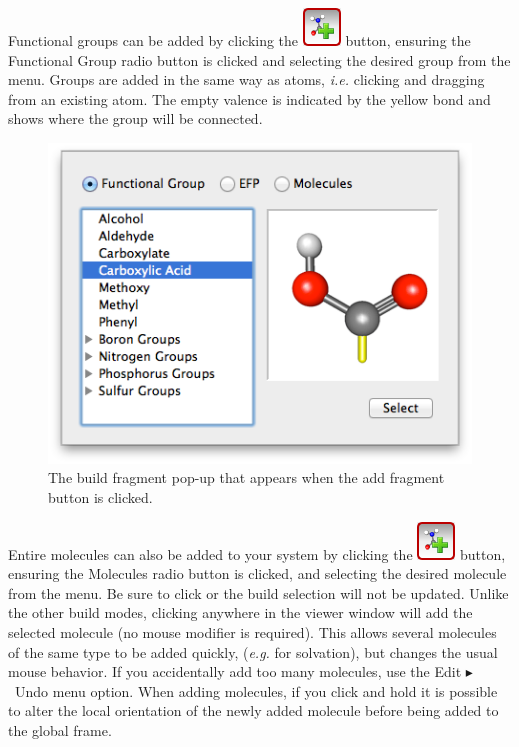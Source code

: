 \documentclass[a4paper,12pt]{article}
\newcommand{\bt}{\ensuremath{\blacktriangleright}}
\begin{document}
Functional groups can be added by clicking the
\includegraphics[scale=0.40]{figures/BuildFragButton.png} button, ensuring the
Functional Group radio button is clicked and selecting the desired group from
the menu.  Groups are added in the same way as atoms, \emph{i.e.} clicking and
dragging from an existing atom.  The empty valence is indicated by the yellow
bond and shows where the group will be connected.
\begin{figure}
\begin{center}
\includegraphics[scale=0.5]{figures/FunctionalGroup.png}
\caption{The build fragment pop-up that appears when the add fragment button
is clicked.} 
\end{center}
\end{figure}


Entire molecules can also be added to your system by clicking the
\includegraphics[scale=0.40]{figures/BuildFragButton.png} button, ensuring the
Molecules radio button is clicked, and selecting the desired molecule from the
menu.  Be sure to click  or the build selection will not be
updated.  Unlike the other build modes, clicking anywhere in the viewer window
will add the selected molecule (no mouse modifier is required).  This allows
several molecules of the same type to be added quickly, (\emph{e.g.} for
solvation), but changes the usual mouse behavior.  If you accidentally add too
many molecules, use the Edit \bt\ Undo menu option.  When adding molecules, if
you click and hold it is possible to alter the local orientation of the newly
added molecule before being added to the global frame.
\end{document}
